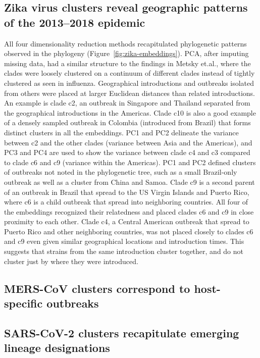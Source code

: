 \documentclass[9pt,lineno]{elife}
\begin{document}
\subsection*{Zika virus clusters reveal geographic patterns of the 2013--2018 epidemic}

All four dimensionality reduction methods recapitulated phylogenetic patterns observed in the phylogeny (Figure~\ref{fig:zika-embeddings}).
PCA, after imputing missing data, had a similar structure to the findings in Metsky et.al., where the clades were loosely clustered on a continuum of different clades instead of tightly clustered as seen in influenza.
Geographical introductions and outbreaks isolated from others were placed at larger Euclidean distances than related introductions.
An example is clade c2, an outbreak in Singapore and Thailand separated from the geographical introductions in the Americas.
Clade c10 is also a good example of a densely sampled outbreak in Colombia (introduced from Brazil) that forms distinct clusters in all the embeddings.
PC1 and PC2 delineate the variance between c2 and the other clades (variance between Asia and the Americas), and PC3 and PC4 are used to show the variance between clade c4 and c3 compared to clade c6 and c9 (variance within the Americas).
PC1 and PC2 defined clusters of outbreaks not noted in the phylogenetic tree, such as a small Brazil-only outbreak as well as a cluster from China and Samoa.
Clade c9 is a second parent of an outbreak in Brazil that spread to the US Virgin Islands and Puerto Rico, where c6 is a child outbreak that spread into neighboring countries.
All four of the embeddings recognized their relatedness and placed clades c6 and c9 in close proximity to each other.
Clade c4, a Central American outbreak that spread to Puerto Rico and other neighboring countries, was not placed closely to clades c6 and c9 even given similar geographical locations and introduction times.
This suggests that strains from the same introduction cluster together, and do not cluster just by where they were introduced.

\subsection*{MERS-CoV clusters correspond to host-specific outbreaks}

\subsection*{SARS-CoV-2 clusters recapitulate emerging lineage designations}
\end{document}
